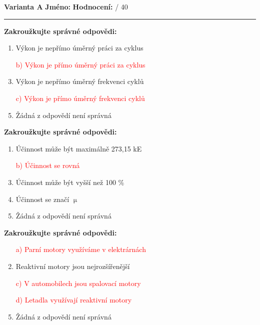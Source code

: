 \documentclass[../main.tex]{subfiles}
\begin{document}
\pagestyle{empty}

\textbf{Varianta A}
\hfill
\textbf{Jméno:}
\tecky{6cm}
\hspace{0.5cm}
\textbf{Hodnocení:}
\tecky{0.5cm}
{/}
{40}
\vspace{0.25cm}
\hrule
\vspace{0.25cm}

\begin{enumerate}[label={\textbf{\arabic*.}}]
\begin{minipage}{0.45\textwidth}
    \item \textbf{Zakroužkujte správné odpovědi:}
        \begin{enumerate}[label={\alph*)}, itemsep=0pt, topsep=0.15cm]
            \item {Výkon je nepřímo úměrný práci za cyklus}
            \item[\textcolor{red}{b)}] \textcolor{red}{{Výkon je přímo úměrný práci za cyklus}}
            \item {Výkon je nepřímo úměrný frekvenci cyklů}
            \item[\textcolor{red}{c)}] \textcolor{red}{{Výkon je přímo úměrný frekvenci cyklů}}
            \item {Žádná z odpovědí není správná}
        \end{enumerate}

    \item \textbf{Zakroužkujte správné odpovědi:}
        \begin{enumerate}[label={\alph*)}, itemsep=0pt, topsep=0.15cm]
            \item {Účinnost může být maximálně 273,15 kE}
            \item[\textcolor{red}{b)}] \textcolor{red}{{Účinnost se rovná }}
            \item {Účinnost může být vyšší než 100 \%}
            \item {Účinnost se značí \(\upmu\)}
            \item {Žádná z odpovědí není správná}
        \end{enumerate}

    \item \textbf{Zakroužkujte správné odpovědi:}
        \begin{enumerate}[label={\alph*)}, itemsep=0pt, topsep=0.15cm]
            \item[\textcolor{red}{a)}] \textcolor{red}{{Parní motory využíváme v elektrárnách}}
            \item {Reaktivní motory jsou nejrozšířenější}
            \item[\textcolor{red}{c)}] \textcolor{red}{{V automobilech jsou spalovací motory}}
            \item[\textcolor{red}{d)}] \textcolor{red}{{Letadla využívají reaktivní motory}}
            \item {Žádná z odpovědí není správná}
        \end{enumerate}


\end{minipage}
\end{enumerate}
\end{document}
